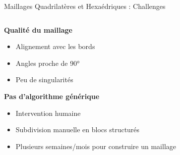 \begin{frame}{Maillages Quadrilatères et Hexaédriques : Challenges}
    \begin{columns}[T] %
        \begin{column}{.5\textwidth}
            \textbf{Qualité du maillage}
            \begin{itemize}
                \item Alignement avec les bords
                \item Angles proche de 90°
                \item Peu de singularités
            \end{itemize}
            
            \textbf{Pas d’algorithme générique}
            \begin{itemize}
                \item Intervention humaine
                \item Subdivision manuelle en blocs structurés
                \item Plusieurs semaines/mois pour construire un maillage
            \end{itemize}
        \end{column}%
        

\end{columns}
\end{frame}
